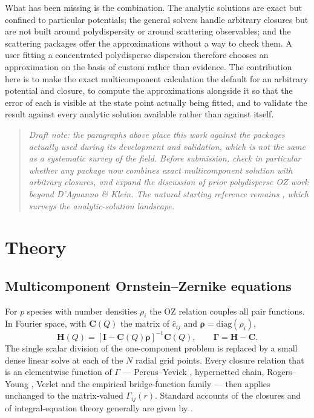 \documentclass[11pt,a4paper]{article}
\newcommand{\Q}{Q}
\begin{document}
What has been missing is the combination. The analytic solutions are exact but
confined to particular potentials; the general solvers handle arbitrary
closures but are not built around polydispersity or around scattering
observables; and the scattering packages offer the approximations without a
way to check them. A user fitting a concentrated polydisperse dispersion
therefore chooses an approximation on the basis of custom rather than
evidence. The contribution here is to make the exact multicomponent
calculation the default for an arbitrary potential and closure, to compute the
approximations alongside it so that the error of each is visible at the state
point actually being fitted, and to validate the result against every analytic
solution available rather than against itself.

\begin{quote}\small\itshape
Draft note: the paragraphs above place this work against the packages
actually used during its development and validation, which is not the same as
a systematic survey of the field. Before submission, check in particular
whether any package now combines exact multicomponent solution with arbitrary
closures, and expand the discussion of prior polydisperse OZ work beyond
D'Aguanno \& Klein. The natural starting reference remains
\citet{KohlbrecherBressler2022}, which surveys the analytic-solution
landscape.
\end{quote}

\section{Theory}

\subsection{Multicomponent Ornstein--Zernike equations}

For $p$ species with number densities $\rho_i$ the OZ relation
\citep{OrnsteinZernike1914} couples all
pair functions. In Fourier space, with $\mathbf{C}(\Q)$ the matrix of
$\hat c_{ij}$ and $\boldsymbol{\rho} = \mathrm{diag}(\rho_i)$,
\begin{equation}
\mathbf{H}(\Q) = \left[\mathbf{I} - \mathbf{C}(\Q)\boldsymbol{\rho}\right]^{-1}
\mathbf{C}(\Q), \qquad
\boldsymbol{\Gamma} = \mathbf{H} - \mathbf{C}.
\label{eq:ozmatrix}
\end{equation}
The single scalar division of the one-component problem is replaced by a small
dense linear solve at each of the $N$ radial grid points. Every closure
relation that is an elementwise function of $\Gamma$ --- Percus--Yevick
\citep{PercusYevick1958},
hypernetted chain, Rogers--Young \citep{RogersYoung1984}, Verlet and the
empirical bridge-function
family --- then applies unchanged to the matrix-valued $\Gamma_{ij}(r)$.
Standard accounts of the closures and of integral-equation theory generally
are given by \citet{HansenMcDonald2013}.
\end{document}
